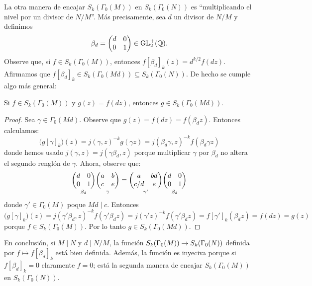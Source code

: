 \documentclass[../../tesis_maestria]{subfiles}
\begin{document}
La otra manera de encajar $S_k(\Gamma_0(M))$ en $S_k(\Gamma_0(N))$ es ``multiplicando el nivel
por un divisor
de $N/M$''. M\'as precisamente, sea $d$ un divisor de $N/M$ y definimos
\[
  \beta_d=\begin{pmatrix}d & 0\\ 0 & 1\end{pmatrix}\in\mathrm{GL}_2^+(\mathbb{Q}).
\]
Observe que, si $f\in S_k(\Gamma_0(M))$, entonces $f[\beta_d]_k(z)=d^{k/2}f(dz)$. Afirmamos que
$f[\beta_d]_k\in S_k(\Gamma_0(Md))\subseteq S_k(\Gamma_0(N))$. De hecho se cumple algo m\'as general:

\begin{lema}\label{lema:subir_nivel_formas}
  Si $f\in S_k(\Gamma_0(M))$ y $g(z)=f(dz)$, entonces $g\in S_k(\Gamma_0(Md))$. 
\end{lema}
\begin{proof}
  Sea $\gamma\in\Gamma_0(Md)$. Observe que $g(z)=f(dz)=f(\beta_dz)$. Entonces
  calculamos:
  \[
    \big(g[\gamma]_k\big)(z)
    =j(\gamma,z)^{-k}g(\gamma z)
    =j(\beta_d\gamma,z)^{-k}f(\beta_d\gamma z)
  \]
  donde hemos usado $j(\gamma,z)=j(\gamma\beta_d, z)$ porque multiplicar $\gamma$ por $\beta_d$ no
  altera el segundo rengl\'on de $\gamma$. Ahora, observe que:
  \[
    \underset{\beta_d}{\begin{pmatrix}d & 0\\ 0 & 1\end{pmatrix}}\underset{\gamma}{\begin{pmatrix}a & b\\ c & e\end{pmatrix}}
    =\underset{\gamma'}{\begin{pmatrix}a & bd\\ c/d & e\end{pmatrix}}\underset{\beta_d}{\begin{pmatrix}d & 0\\ 0 & 1\end{pmatrix}}
  \]
  donde $\gamma'\in\Gamma_0(M)$ poque $Md\mid c$. Entonces
  \[
    \big(g[\gamma]_k\big)(z)
    =j(\gamma'\beta_d,z)^{-k}f(\gamma'\beta_d z)
    =j(\gamma'z)^{-k}f(\gamma'\beta_d z)
    =f[\gamma']_k(\beta_dz)
    =f(dz)=g(z)
  \]
  porque $f\in S_k(\Gamma_0(M))$. Por lo tanto $g\in S_k(\Gamma_0(Md))$.
\end{proof}

En conclusi\'on, si $M\mid N$ y $d\mid N/M$, la funci\'on $S_k(\Gamma_0(M))\rightarrow S_k(\Gamma_0(N))$
definida por $f\mapsto f[\beta_d]_k$ est\'a bien definida. Adem\'as, la funci\'on es inyeciva porque
si $f[\beta_d]_k=0$ claramente $f=0$; est\'a la segunda manera de encajar $S_k(\Gamma_0(M))$ en
$S_k(\Gamma_0(N))$.

\end{document}
